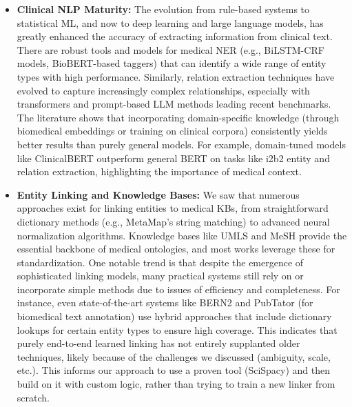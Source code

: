 \begin{itemize}
\item \textbf{Clinical NLP Maturity:} The evolution from rule-based systems to statistical ML, and now to deep learning and large language models, has greatly enhanced the accuracy of extracting information from clinical text. There are robust tools and models for medical NER (e.g., BiLSTM-CRF models, BioBERT-based taggers) that can identify a wide range of entity types with high performance. Similarly, relation extraction techniques have evolved to capture increasingly complex relationships, especially with transformers and prompt-based LLM methods leading recent benchmarks. The literature shows that incorporating domain-specific knowledge (through biomedical embeddings or training on clinical corpora) consistently yields better results than purely general models. For example, domain-tuned models like ClinicalBERT outperform general BERT on tasks like i2b2 entity and relation extraction, highlighting the importance of medical context.

\item \textbf{Entity Linking and Knowledge Bases:} We saw that numerous approaches exist for linking entities to medical KBs, from straightforward dictionary methods (e.g., MetaMap's string matching) to advanced neural normalization algorithms. Knowledge bases like UMLS and MeSH provide the essential backbone of medical ontologies, and most works leverage these for standardization. One notable trend is that despite the emergence of sophisticated linking models, many practical systems still rely on or incorporate simple methods due to issues of efficiency and completeness. For instance, even state-of-the-art systems like BERN2 and PubTator (for biomedical text annotation) use hybrid approaches that include dictionary lookups for certain entity types to ensure high coverage. This indicates that purely end-to-end learned linking has not entirely supplanted older techniques, likely because of the challenges we discussed (ambiguity, scale, etc.). This informs our approach to use a proven tool (SciSpacy) and then build on it with custom logic, rather than trying to train a new linker from scratch.


\end{itemize}
